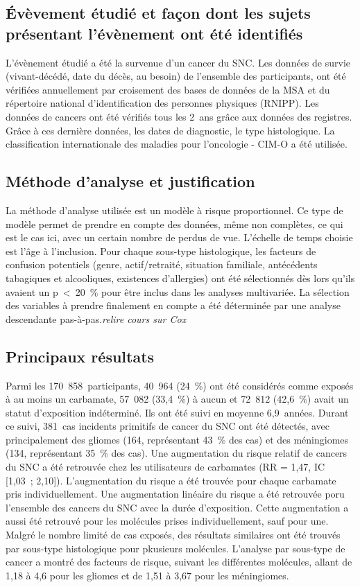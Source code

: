 \documentclass[10pt]{article}
\begin{document}
\subsection{\'{E}vèvement étudié et façon dont les sujets présentant l'évènement ont été identifiés}
L'évènement étudié a été la survenue d'un cancer du SNC. Les données de survie (vivant-décédé, date du décès, au besoin) de l'ensemble des participants, ont été vérifiées annuellement par croisement des bases de données de la MSA et du répertoire national d'identification des personnes physiques (RNIPP). Les données de cancers ont été vérifiés tous les 2~ans grâce aux données des registres. Grâce à ces dernière données, les dates de diagnostic, le type histologique. La classification internationale des maladies pour l'oncologie - CIM-O a été utilisée.

\subsection{Méthode d'analyse et justification}
La méthode d'analyse utilisée est un modèle à risque proportionnel. Ce type de modèle permet de prendre en compte des données, même non complètes, ce qui est le cas ici, avec un certain nombre de perdus de vue. L'échelle de temps choisie est l'âge à l'inclusion. Pour chaque sous-type histologique, les facteurs de confusion potentiels (genre, actif/retraité, situation familiale, antécédents tabagiques et alcooliques, existences d'allergies) ont été sélectionnés dès lors qu'ils avaient un p~<~20~\% pour être inclus dans les analyses multivariée. La sélection des variables à prendre finalement en compte a été déterminée par une analyse descendante pas-à-pas.\emph{relire cours sur Cox}

\subsection{Principaux résultats}
Parmi les 170~858~participants, 40~964 (24~\%) ont été considérés comme exposés à au moins un carbamate, 57~082 (33,4~\%) à aucun et 72~812 (42,6~\%) avait un statut d'exposition indéterminé. Ils ont été suivi en moyenne 6,9~années. Durant ce suivi, 381~cas incidents primitifs de cancer du SNC ont été détectés, avec principalement des gliomes (164, représentant 43~\% des cas) et des méningiomes (134, représentant 35~\% des cas). Une augmentation du risque relatif de cancers du SNC a été retrouvée chez les utilisateurs de carbamates (RR = 1,47, IC [1,03~; 2,10]). L'augmentation du risque a été trouvée pour chaque carbamate pris individuellement. Une augmentation linéaire du risque a été retrouvée poru l'ensemble des cancers du SNC avec la durée d'exposition. Cette augmentation a aussi été retrouvé pour les molécules prises individuellement, sauf pour une. Malgré le nombre limité de cas exposés, des résultats similaires ont été trouvés par sous-type histologique pour pkusieurs molécules. L'analyse par sous-type de cancer a montré des facteurs de risque, suivant les différentes molécules, allant de 1,18 à 4,6 pour les gliomes et de 1,51 à 3,67 pour les méningiomes.
\end{document}

